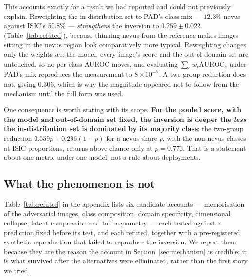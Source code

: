 This accounts exactly for a result we had reported and could not previously explain.
Reweighting the in-distribution set to PAD's class mix --- $12.3\%$ nevus against
ISIC's $50.8\%$ --- \emph{strengthens} the inversion to $0.259 \pm 0.022$
(Table~\ref{tab:refuted}), because thinning nevus from the reference makes images
sitting in the nevus region look comparatively more typical. Reweighting changes only
the weights $w_c$; the model, every image's score and the out-of-domain set are
untouched, so no per-class AUROC moves, and evaluating $\sum_c w_c \mathrm{AUROC}_c$
under PAD's mix reproduces the measurement to $8 \times 10^{-7}$. A two-group
reduction does not, giving $0.306$, which is why the magnitude appeared not to follow
from the mechanism until the full form was used.

One consequence is worth stating with its scope. \textbf{For the pooled score, with
the model and out-of-domain set fixed, the inversion is deeper the \emph{less} the
in-distribution set is dominated by its majority class}: the two-group reduction
$0.559p + 0.296(1-p)$ for a nevus share $p$, with the non-nevus classes at ISIC
proportions, returns above chance only at $p = 0.776$. That is a statement about one
metric under one model, not a rule about deployments.

\subsection{What the phenomenon is not}


Table~\ref{tab:refuted} in the appendix lists six candidate accounts --- memorisation
of the adversarial images, class composition, domain specificity, dimensional collapse,
latent compression and tail asymmetry --- each tested against a prediction fixed before
its test, and each refuted, together with a pre-registered synthetic reproduction that
failed to reproduce the inversion. We report them because they are the reason the
account in Section~\ref{sec:mechanism} is credible: it is what survived after the
alternatives were eliminated, rather than the first story we tried.


